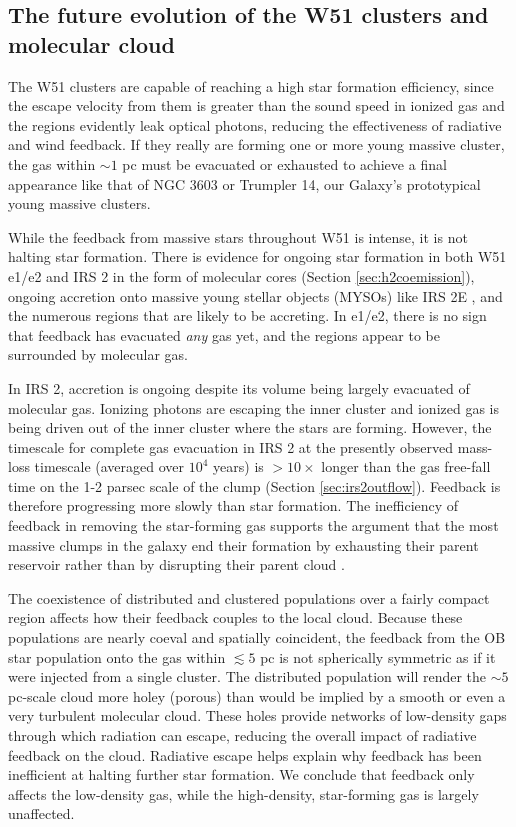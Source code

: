 \subsection{The future evolution of the W51 clusters and molecular cloud}
The W51 clusters are capable of reaching a high star formation efficiency,
since the escape velocity from them is greater than the sound speed in ionized gas
\citep{Matzner2002a,Ginsburg2012a,Bressert2012a,Dale2014a} and
the \hii regions evidently leak optical photons, reducing the effectiveness of
radiative and wind feedback.  If they really are
forming one or more
young massive cluster, the gas within $\sim 1$ pc must be evacuated or
exhausted to achieve a final appearance like that of NGC 3603 or Trumpler 14,
our Galaxy's prototypical young massive clusters.


While the feedback from massive stars throughout W51 is intense, it is not
halting star formation.  There is evidence for ongoing star formation in both
W51 e1/e2 and IRS 2 in the form of molecular cores (Section
\ref{sec:h2coemission}), ongoing accretion onto massive young stellar objects
(MYSOs) like IRS 2E \citep{Figueredo2008a}, and the numerous \hchii regions
that are likely to be accreting.  In e1/e2, there is no sign that feedback
has evacuated \emph{any} gas yet, and the \hii regions appear to be surrounded
by molecular gas.

In IRS 2, accretion is ongoing despite its volume being largely evacuated of
molecular gas.
Ionizing photons are escaping the inner cluster and ionized gas is being driven
out of the inner cluster where the stars are forming.  However, the timescale
for complete gas evacuation in IRS 2 at the presently observed mass-loss timescale
(averaged over $10^4$ years) is $>10\times$ longer than the gas free-fall time
on the 1-2 parsec scale of the clump 
(Section \ref{sec:irs2outflow}).
Feedback is therefore progressing more slowly
than star formation.
The inefficiency of feedback in removing the star-forming
gas supports the argument that the most massive clumps in
the galaxy  end their formation by exhausting their parent reservoir rather
than by disrupting their parent cloud \citep{Kruijssen2012a,Matzner2015a}.

The coexistence of distributed and clustered populations over a fairly compact
region affects how their feedback couples to the local cloud.  Because these
populations are nearly coeval and spatially coincident, the feedback from the
OB star population onto the gas within $\lesssim5$ pc is not spherically symmetric as
if it were injected from a single cluster.  The distributed population will
render the $\sim5$ pc-scale cloud more holey (porous) than would be
implied by a smooth or even a very turbulent molecular cloud.  These holes
provide networks of low-density gaps through which radiation can escape,
reducing the overall impact of radiative feedback on the cloud.  Radiative
escape helps explain why feedback has been inefficient at halting further star
formation.  We conclude that feedback only affects the low-density gas, while
the high-density, star-forming gas is largely unaffected.

